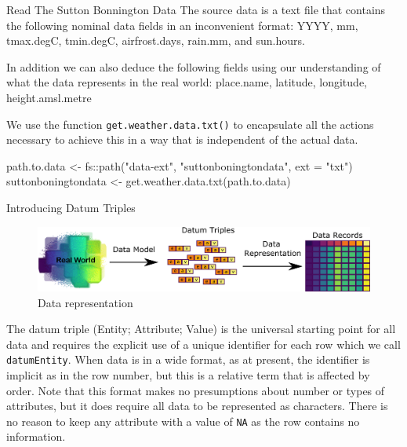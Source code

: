 \documentclass[
  ignorenonframetext,
]{beamer}
\newenvironment{Shaded}{\begin{snugshade}}{\end{snugshade}}
\newcommand{\AttributeTok}[1]{\textcolor[rgb]{0.77,0.63,0.00}{#1}}
\newcommand{\FunctionTok}[1]{\textcolor[rgb]{0.00,0.00,0.00}{#1}}
\newcommand{\NormalTok}[1]{#1}
\newcommand{\OtherTok}[1]{\textcolor[rgb]{0.56,0.35,0.01}{#1}}
\newcommand{\SpecialCharTok}[1]{\textcolor[rgb]{0.00,0.00,0.00}{#1}}
\newcommand{\StringTok}[1]{\textcolor[rgb]{0.31,0.60,0.02}{#1}}
\begin{document}
\begin{frame}[fragile]{Read The Sutton Bonnington Data}
\protect\hypertarget{read-the-sutton-bonnington-data}{}
The source data is a text file that contains the following nominal data
fields in an inconvenient format: YYYY, mm, tmax.degC, tmin.degC,
airfrost.days, rain.mm, and sun.hours.

In addition we can also deduce the following fields using our
understanding of what the data represents in the real world: place.name,
latitude, longitude, height.amsl.metre

We use the function \texttt{get.weather.data.txt()} to encapsulate all
the actions necessary to achieve this in a way that is independent of
the actual data.

\begin{Shaded}
\begin{Highlighting}[]
\NormalTok{path.to.data }\OtherTok{\textless{}{-}}
\NormalTok{  fs}\SpecialCharTok{::}\FunctionTok{path}\NormalTok{(}\StringTok{"data{-}ext"}\NormalTok{, }\StringTok{"suttonboningtondata"}\NormalTok{, }\AttributeTok{ext =} \StringTok{"txt"}\NormalTok{)}
\NormalTok{suttonboningtondata }\OtherTok{\textless{}{-}} \FunctionTok{get.weather.data.txt}\NormalTok{(path.to.data)}
\end{Highlighting}
\end{Shaded}
\end{frame}

\begin{frame}[fragile]{Introducing Datum Triples}
\protect\hypertarget{introducing-datum-triples}{}
\begin{figure}

{\centering \includegraphics[width=0.7\linewidth]{images/standalone-data-definition} 

}

\caption{ Data representation}\label{fig:FigTheoryNascentData}
\end{figure}

The datum triple (Entity; Attribute; Value) is the universal starting
point for all data and requires the explicit use of a unique identifier
for each row which we call \texttt{datumEntity}. When data is in a wide
format, as at present, the identifier is implicit as in the row number,
but this is a relative term that is affected by order. Note that this
format makes no presumptions about number or types of attributes, but it
does require all data to be represented as characters. There is no
reason to keep any attribute with a value of \texttt{NA} as the row
contains no information.
\end{frame}
\end{document}
